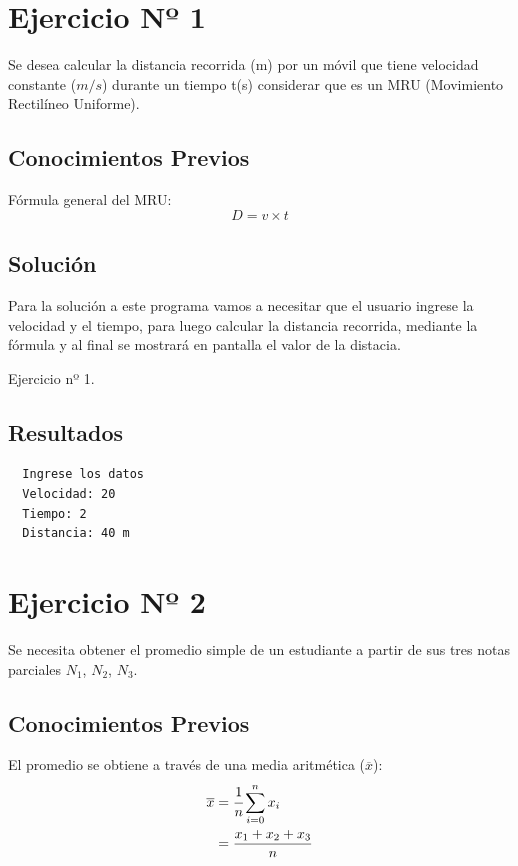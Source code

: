 \section{Ejercicio Nº 1}
Se desea calcular la distancia recorrida (m) por un móvil que tiene velocidad
constante ($m/s$) durante un tiempo t\@(s) considerar que es un MRU (Movimiento
Rectilíneo Uniforme).
\subsection{Conocimientos Previos}
Fórmula general del MRU\@:
\[D = v\times t\]
\subsection{Solución}
Para la solución a este programa vamos a necesitar que el usuario ingrese la
velocidad y el tiempo, para luego calcular la distancia recorrida, mediante la
fórmula y al final se mostrará en pantalla el valor de la distacia.
\begin{longlisting}
	\caption{Ejercicio nº 1.}\label{cod:ex_1}
\end{longlisting}
\subsection{Resultados}
\begin{minipage}{14cm}
	\begin{verbatim}
  Ingrese los datos
  Velocidad: 20
  Tiempo: 2
  Distancia: 40 m
	\end{verbatim}
\end{minipage}
\newpage
\section{Ejercicio Nº 2}
Se necesita obtener el promedio simple de un estudiante a partir de sus tres
notas parciales $N_1$, $N_2$, $N_3$.
\subsection{Conocimientos Previos}
El promedio se obtiene a través de una media aritmética ($\overline{x}$):
\begin{align*}
	\overline{x} & = \cfrac{1}{n}\sum_{i=0}^n {x_i} \\
	             & = \frac{x_1 + x_2 + x_3}{n}
\end{align*}
